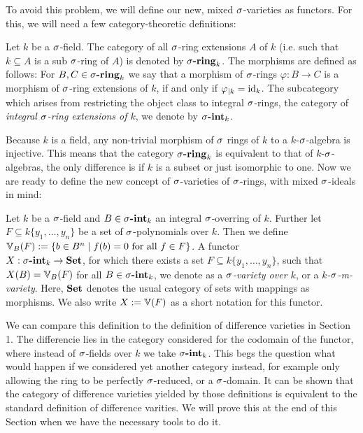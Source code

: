 To avoid this problem, we will define our new, mixed $\sigma$-varieties as functors. For this, we will need a few category-theoretic definitions:

\begin{defn}
Let $k$ be a $\sigma$-field. The category of all $\sigma$-ring extensions $A$ of $k$ (i.e. such that $k \subseteq A$ is a sub $\sigma$-ring of $A$) is denoted by $\sringk$. The morphisms are defined as follows: For $B,C \in \sigma\text{{\normalfont\textbf{-ring}}}_k$ we say that a morphism of $\sigma$-rings $\varphi: B \rightarrow C$ is a morphism of $\sigma$-ring extensions of $k$, if and only if $\varphi_{|k} = \text{id}_k$.
The subcategory which arises from restricting the object class to integral $\sigma$-rings, the category of \emph{integral $\sigma$-ring extensions of $k$}, we denote by $\sintk$. \index{$\sintk$} \index{$\sringk$} 
\end{defn}

Because $k$ is a field, any non-trivial morphism of $\sigma$ rings of $k$ to a $k$-$\sigma$-algebra is injective. This means that the category $\sringk$ is equivalent to that of $k$-$\sigma$-algebras, the only difference is if $k$ is a subset or just isomorphic to one. Now we are ready to define the new concept of $\sigma$-varieties of $\sigma$-rings, with mixed $\sigma$-ideals in mind:

\begin{defn}\label{defnVV}
Let $k$ be a $\sigma$-field and $B \in \sigma\text{{\normalfont\textbf{-int}}}_k$ an integral $\sigma$-overring of $k$. Further let $F \subseteq k\{y_1, \ldots, y_n\}$ be a set of $\sigma$-polynomials over $k$. 
Then we define $\mathbb{V}_B(F):= \{ b \in B^n \mid f(b) = 0 \text{ for all } f \in F \}$. A functor \\ $X: \sigma\text{{\normalfont\textbf{-int}}}_k \rightarrow {\normalfont\textbf{Set}}$, for which there exists a set $F \subseteq k\{y_1, \ldots, y_n \}$, such that $X(B) = \mathbb{V}_B(F)$ for all $B \in \sigma\text{{\normalfont\textbf{-int}}}_k$, we denote as a \emph{$\sigma$-variety over $k$}, or a \emph{$k$-$\sigma$-m-variety}.
Here, ${\normalfont\textbf{Set}}$ denotes the usual category of sets with mappings as morphisms. We also write $X := \mathbb{V}(F)$ as a short notation for this functor.   
\end{defn}

We can compare this definition to the definition of difference varieties in Section 1. The differencie lies in the category considered for the codomain of the functor, where instead of $\sigma$-fields over $k$ we take $\sintk$.
This begs the question what would happen if we considered yet another category instead, for example only allowing the ring to be perfectly $\sigma$-reduced, or a $\sigma$-domain. It can be shown that the category of difference varieties
yielded by those definitions is equivalent to the standard definition of difference varities. We will prove this at the end of this Section when we have the necessary tools to do it.

